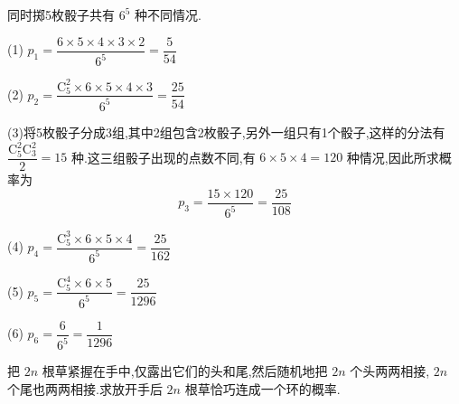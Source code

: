 \begin{solution}
    同时掷5枚骰子共有 $6^5$ 种不同情况.

    \vspace{0.3em}

    (1) $p_1 = \dfrac{6 \times 5 \times 4 \times 3 \times 2}{6^5} = \dfrac{5}{54}$

    \vspace{0.3em}

    (2) $p_2 = \dfrac{\mathrm{C}_5^2 \times 6 \times 5 \times 4 \times 3}{6^5} = \dfrac{25}{54}$

    \vspace{0.3em}

    (3)将5枚骰子分成3组,其中2组包含2枚骰子,另外一组只有1个骰子,这样的分法有 $\dfrac{\mathrm{C}_5^2 \mathrm{C}_3^2}{2} = 15$ 种.这三组骰子出现的点数不同,有 $6 \times 5 \times 4 = 120$ 种情况,因此所求概率为
    $$
    p_3 = \dfrac{15 \times 120}{6^5} = \dfrac{25}{108}
    $$

    (4) $p_4 = \dfrac{\mathrm{C}_5^3 \times 6 \times 5 \times 4}{6^5} = \dfrac{25}{162}$

    \vspace{0.3em}

    (5) $p_5 = \dfrac{\mathrm{C}_5^4 \times 6 \times 5}{6^5} = \dfrac{25}{1296}$

    (6) $p_6 = \dfrac{6}{6^5} = \dfrac{1}{1296}$
\end{solution}

\question[接草成环问题] 把 $2n$ 根草紧握在手中,仅露出它们的头和尾,然后随机地把 $2n$ 个头两两相接, $2n$ 个尾也两两相接.求放开手后 $2n$ 根草恰巧连成一个环的概率.

